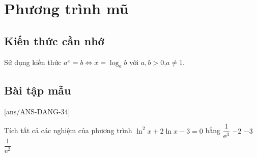 \setcounter{section}{33}
\setcounter{ex}{0}
\section{Phương trình mũ}
\subsection{Kiến thức cần nhớ}
\begin{khung}
	Sử dụng kiến thức $a^x=b\Leftrightarrow x=\log_{a}b$ với $a,b>0$,$a\ne 1$.
\end{khung}
\subsection{Bài tập mẫu}
[ans/ANS-DANG-34]
\begin{khung}
	\begin{vd}%
		Tích tất cả các nghiệm của phương trình $\ln ^2{x}+2\ln x-3=0$ bằng
		\choice
		{\True $\dfrac{1}{\mathrm{e^3}}$}
		{$-2$}
		{$-3$}
		{$\dfrac{1}{\mathrm{e^2}}$}
	\end{vd}
\end{khung}
